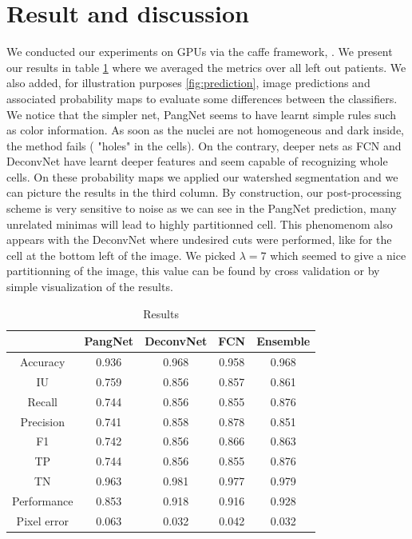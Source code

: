 \documentclass{article}
\begin{document}
\section{Result and discussion}
\label{sec:result}
\noindent We conducted our experiments on GPUs via the caffe framework, 
\cite{jia2014caffe}. We present our results in table \ref{tab:res} where 
we averaged the metrics over all left out patients. We also added, for 
illustration purposes \ref{fig:prediction}, image predictions and 
associated 
probability maps to evaluate some differences between the classifiers. 
We notice that the simpler net, PangNet seems to have learnt simple 
rules such as color information. As soon as the nuclei are not
homogeneous and dark inside, the method fails ( "holes" in the
cells). On the 
contrary, deeper nets as FCN and DeconvNet have learnt deeper features 
and seem capable of recognizing whole cells. On these probability maps 
we applied our watershed segmentation and we can picture the results in 
the third 
column. By construction, our post-processing 
scheme is very sensitive to noise as we can see in the PangNet 
prediction, many unrelated minimas will lead to highly partitionned cell. 
This phenomenom also appears with the DeconvNet where undesired 
cuts were performed, like for the cell at the bottom left of the image. 
We picked $\lambda = 7$ which seemed to give a nice partitionning of 
the image, this value can be found by cross validation or by simple 
visualization of the results.
\begin{table}
\begin{tabular}{|c|c|c|c|c|}
\hline
  & PangNet & DeconvNet & FCN & Ensemble\\
 \hline
Accuracy  &       0.936 & 0.968 &0.958 & 0.968  \\
IU   &    0.759 &     0.856 & 0.857 & 0.861 \\
Recall     &       0.744  &     0.856 & 0.855 & 0.876\\
Precision   &       0.741 &     0.858 & 0.878 & 0.851\\
F1    &       0.742 &     0.856 & 0.866  & 0.863\\
TP       &       0.744 &     0.856 & 0.855 & 0.876 \\
TN      &       0.963 &     0.981 &  0.977 & 0.979\\
Performance    &       0.853 &     0.918 & 0.916 & 0.928\\
Pixel error  &  0.063 &     0.032 & 0.042 & 0.032\\
\hline
\end{tabular}
\caption{Results}
\label{tab:res}
\end{table}
\end{document}
